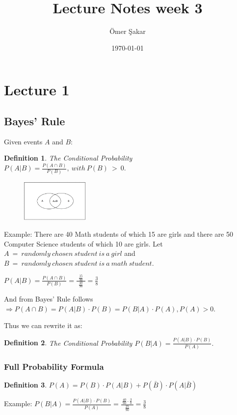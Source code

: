 \documentclass[12pt]{scrartcl}
\title{Lecture Notes week 3}
\author{\"Omer \c Sakar}
\date{\today}
\newtheorem{defi}{Definition}
\begin{document}
\maketitle
\tableofcontents
\newpage

\section{Lecture 1}

\subsection{Bayes' Rule}
Given events $A$ and $B$:\newline

\begin{defi}
 	The Conditional Probability $P(A | B) = \frac{P(A \cap B) }{P(B)},\ 	 with\ P(B)\ >\ 0.$
\end{defi}

\begin{figure}[h]
	\centering
	\includegraphics[width=0.3\textwidth]{./images/venn_diagram.png}
\end{figure}

\noindent Example: There are 40 Math students of which 15 are girls and there are 50 Computer Science students of which 10 are girls.\newline
Let $A\ =\ randomly\ chosen\ student\ is\ a\ girl$ and $B\ =\ randomly\ chosen\ student\ is\ a\ math\ student$.
\newline

$P(A | B) = \frac{P(A \cap B)}{P(B)} = \frac{\ \ \frac{15}{90}\ \ }{\frac{40}{90}} = \frac{3}{8}$\newline

\noindent And from Bayes' Rule follows $\Rightarrow P(A \cap B) = P(A | B)\cdot P(B) = P(B|A)\cdot P(A), P(A) > 0$.

\noindent Thus we can rewrite it as:
\begin{defi}
 	The Conditional Probability $P(B | A) = \frac{P(A | B)\cdot P(B) }{P(A)}.$
\end{defi}

\subsubsection{Full Probability Formula}
\begin{defi}
	$P(A) = P(B) \cdot P(A | B) + P(\bar{B})\cdot P(A | \bar{B})$
\end{defi}
\noindent Example: $P(B | A) = \frac{P(A | B)\cdot P(B)}{P(A)} = \frac{\ \frac{40}{90}\cdot \frac{3}{8}\ }{\frac{25}{90}} = \frac{3}{8}$\newline
\end{document}
